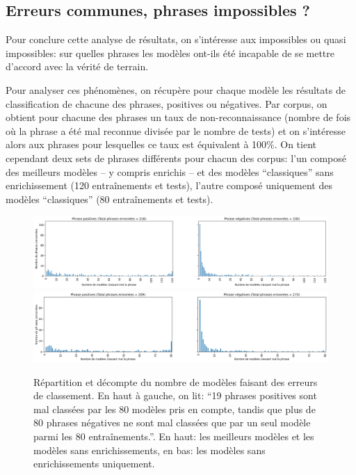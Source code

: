 \subsection{Erreurs communes, phrases impossibles ?}

Pour conclure cette analyse de résultats, on s'intéresse aux impossibles ou quasi impossibles: sur quelles phrases les modèles ont-ils été incapable de se mettre d'accord avec la vérité de terrain. 

Pour analyser ces phénomènes, on récupère pour chaque modèle les résultats de classification de chacune des phrases, positives ou négatives. Par corpus, on obtient pour chacune des phrases un taux de non-reconnaissance (nombre de fois où la phrase a été mal reconnue divisée par le nombre de tests) et on s'intéresse alors aux phrases pour lesquelles ce taux est équivalent à 100\%. On tient cependant deux sets de phrases différents pour chacun des corpus: l'un composé des meilleurs modèles -- y compris enrichis -- et des modèles ``classiques'' sans enrichissement (120 entraînements et tests), l'autre composé uniquement des modèles ``classiques'' (80 entraînements et tests).

\begin{figure}[ht]
    \centering
    \includegraphics[width=\linewidth]{figures/chap4/commonErrors.png}
    \includegraphics[width=\linewidth]{figures/chap4/commonErrorsNotEnriched.png}
    \caption{Répartition et décompte du nombre de modèles faisant des erreurs de classement. En haut à gauche, on lit: ``19 phrases positives sont mal classées par les 80 modèles pris en compte, tandis que plus de 80 phrases négatives ne sont mal classées que par un seul modèle parmi les 80 entraînements.''. En haut: les meilleurs modèles et les modèles sans enrichissements, en bas: les modèles sans enrichissements uniquement.}
    \label{fig:chap4:commonErrors}
\end{figure}


